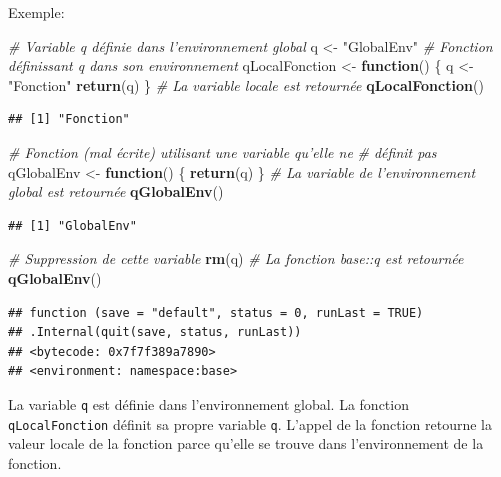 \documentclass[
  12pt,
  french,
  a4paper,
  extrafontsizes,onecolumn,openright
  ]{memoir}
\newenvironment{Shaded}{\begin{snugshade}}{\end{snugshade}}
\newcommand{\CommentTok}[1]{\textcolor[rgb]{0.56,0.35,0.01}{\textit{#1}}}
\newcommand{\ControlFlowTok}[1]{\textcolor[rgb]{0.13,0.29,0.53}{\textbf{#1}}}
\newcommand{\KeywordTok}[1]{\textcolor[rgb]{0.13,0.29,0.53}{\textbf{#1}}}
\newcommand{\NormalTok}[1]{#1}
\newcommand{\StringTok}[1]{\textcolor[rgb]{0.31,0.60,0.02}{#1}}
\begin{document}
Exemple:

\scriptsize

\begin{Shaded}
\begin{Highlighting}[]
\CommentTok{# Variable q définie dans l'environnement global}
\NormalTok{q <-}\StringTok{ "GlobalEnv"}
\CommentTok{# Fonction définissant q dans son environnement}
\NormalTok{qLocalFonction <-}\StringTok{ }\ControlFlowTok{function}\NormalTok{() \{}
\NormalTok{    q <-}\StringTok{ "Fonction"}
    \KeywordTok{return}\NormalTok{(q)}
\NormalTok{\}}
\CommentTok{# La variable locale est retournée}
\KeywordTok{qLocalFonction}\NormalTok{()}
\end{Highlighting}
\end{Shaded}

\begin{verbatim}
## [1] "Fonction"
\end{verbatim}

\begin{Shaded}
\begin{Highlighting}[]
\CommentTok{# Fonction (mal écrite) utilisant une variable qu'elle ne}
\CommentTok{# définit pas}
\NormalTok{qGlobalEnv <-}\StringTok{ }\ControlFlowTok{function}\NormalTok{() \{}
    \KeywordTok{return}\NormalTok{(q)}
\NormalTok{\}}
\CommentTok{# La variable de l'environnement global est retournée}
\KeywordTok{qGlobalEnv}\NormalTok{()}
\end{Highlighting}
\end{Shaded}

\begin{verbatim}
## [1] "GlobalEnv"
\end{verbatim}

\begin{Shaded}
\begin{Highlighting}[]
\CommentTok{# Suppression de cette variable}
\KeywordTok{rm}\NormalTok{(q)}
\CommentTok{# La fonction base::q est retournée}
\KeywordTok{qGlobalEnv}\NormalTok{()}
\end{Highlighting}
\end{Shaded}

\begin{verbatim}
## function (save = "default", status = 0, runLast = TRUE) 
## .Internal(quit(save, status, runLast))
## <bytecode: 0x7f7f389a7890>
## <environment: namespace:base>
\end{verbatim}

\normalsize

La variable \texttt{q} est définie dans l'environnement global.
La fonction \texttt{qLocalFonction} définit sa propre variable \texttt{q}.
L'appel de la fonction retourne la valeur locale de la fonction parce qu'elle se trouve dans l'environnement de la fonction.
\end{document}
